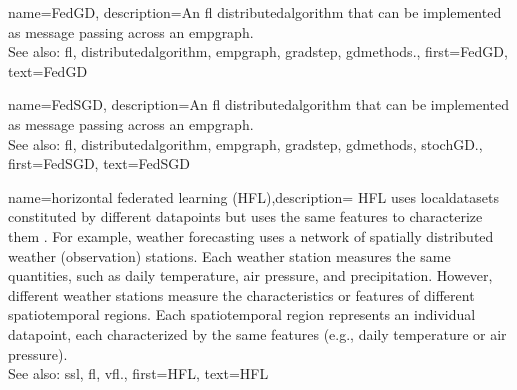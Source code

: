 {name={FedGD},
	description={An \gls{fl} \gls{distributedalgorithm} that 
		can be implemented as message passing across an \gls{empgraph}. 
		\\ 
		See also: \gls{fl}, \gls{distributedalgorithm}, \gls{empgraph}, \gls{gradstep}, \gls{gdmethods}.},
	first={FedGD},
	text={FedGD}
} 

{name={FedSGD},
	description={An \gls{fl} \gls{distributedalgorithm} that 
		can be implemented as message passing across an \gls{empgraph}. 
		\\ 
		See also: \gls{fl}, \gls{distributedalgorithm}, \gls{empgraph}, \gls{gradstep}, \gls{gdmethods}, \gls{stochGD}.},
	first={FedSGD},
	text={FedSGD}
} 

{name={horizontal federated learning (HFL)},description=
	{HFL uses \glspl{localdataset} constituted by different
	   \glspl{datapoint} but uses the same \glspl{feature} to characterize them \cite{HFLChapter2020}.
		For example, weather forecasting uses a network of spatially distributed
		weather (observation) stations. Each weather station measures the
		same quantities, such as daily temperature, air pressure, and precipitation.
		However, different weather stations measure the characteristics or
		\glspl{feature} of different spatiotemporal regions. Each spatiotemporal region 
		represents an individual \gls{datapoint}, each characterized by the same \glspl{feature} 
		(e.g., daily temperature or air pressure).\\
		See also: \gls{ssl}, \gls{fl}, \gls{vfl}.},
	first={HFL},
	text={HFL}
} 

